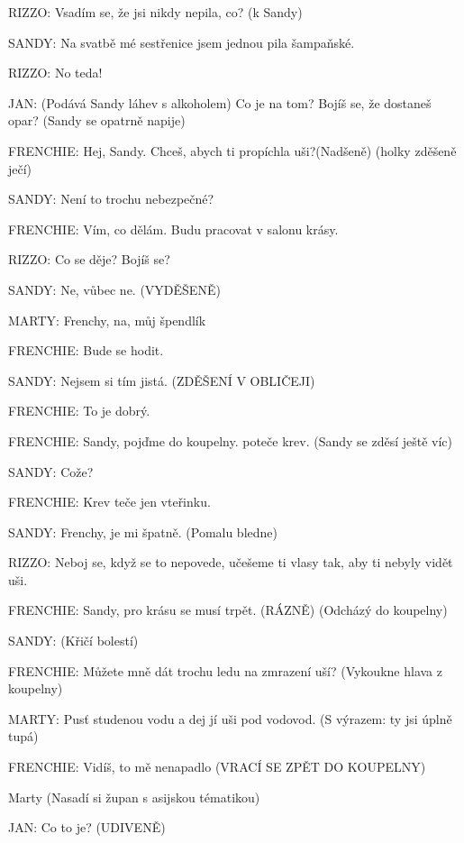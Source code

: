 \rep RIZZO:                Vsadím se, že jsi nikdy nepila, co? (k Sandy)

\rep SANDY:                Na svatbě mé sestřenice jsem jednou pila šampaňské.

\rep RIZZO:                No teda!

\rep JAN:                (Podává Sandy láhev s alkoholem) Co je na tom? Bojíš se, že dostaneš                 opar? (Sandy se opatrně napije)

\rep FRENCHIE:        Hej, Sandy. Chceš, abych ti propíchla uši?(Nadšeně) (holky zděšeně ječí) 

\rep SANDY:        Není to trochu nebezpečné?

\rep FRENCHIE:        Vím, co dělám. Budu pracovat v salonu krásy.

\rep RIZZO:        Co se děje? Bojíš se?

\rep SANDY:        Ne, vůbec ne. (VYDĚŠENĚ)

\rep MARTY:        Frenchy, na, můj špendlík

\rep FRENCHIE:        Bude se hodit. 

\rep SANDY:        Nejsem si tím jistá. (ZDĚŠENÍ V OBLIČEJI)

\rep FRENCHIE:        To je dobrý. 

\rep FRENCHIE:        Sandy, pojďme do koupelny. poteče krev. (Sandy se zděsí ještě víc)

\rep SANDY:        Cože?

\rep FRENCHIE:        Krev teče jen vteřinku.

\rep SANDY:        Frenchy, je mi špatně. (Pomalu bledne)

\rep RIZZO:        Neboj se, když se to nepovede, učešeme ti vlasy tak, aby ti nebyly vidět         uši.

\rep FRENCHIE:        Sandy, pro krásu se musí trpět. (RÁZNĚ) (Odcházý do koupelny) 

\rep SANDY:        (Křičí bolestí)

\rep FRENCHIE:        Můžete mně dát trochu ledu na zmrazení uší? (Vykoukne hlava z                 koupelny)

\rep MARTY:        Pusť studenou vodu a dej jí uši pod vodovod. (S výrazem: ty jsi úplně         tupá) 

\rep FRENCHIE:        Vidíš, to mě nenapadlo (VRACÍ SE ZPĚT DO KOUPELNY)

 Marty  (Nasadí si župan s asijskou tématikou)

\rep JAN:        Co to je? (UDIVENĚ)

